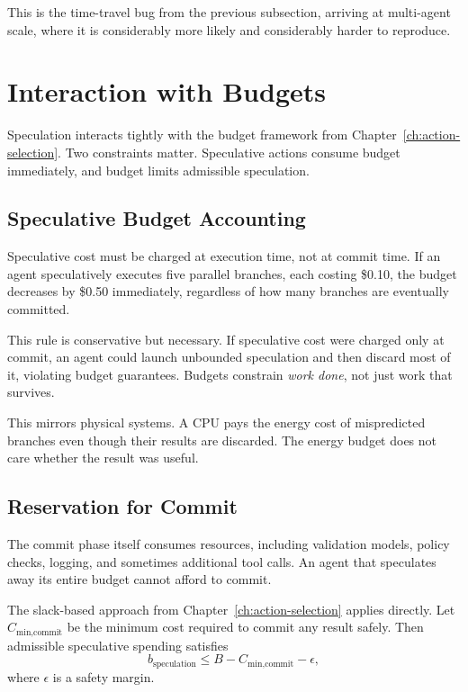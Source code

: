 This is the time-travel bug from the previous subsection, arriving at multi-agent
scale, where it is considerably more likely and considerably harder to reproduce.

\section{Interaction with Budgets}

Speculation interacts tightly with the budget framework from Chapter~\ref{ch:action-selection}. Two constraints matter. Speculative actions consume budget immediately, and budget limits admissible speculation.

\subsection{Speculative Budget Accounting}

Speculative cost must be charged at execution time, not at commit time. If an agent speculatively executes five parallel branches, each costing \$0.10, the budget decreases by \$0.50 immediately, regardless of how many branches are eventually committed.

This rule is conservative but necessary. If speculative cost were charged only at commit, an agent could launch unbounded speculation and then discard most of it, violating budget guarantees. Budgets constrain \emph{work done}, not just work that survives.

This mirrors physical systems. A CPU pays the energy cost of mispredicted branches even though their results are discarded. The energy budget does not care whether the result was useful.

\subsection{Reservation for Commit}

The commit phase itself consumes resources, including validation models, policy checks, logging, and sometimes additional tool calls. An agent that speculates away its entire budget cannot afford to commit.

The slack-based approach from Chapter~\ref{ch:action-selection} applies directly. Let $C_{\text{min,commit}}$ be the minimum cost required to commit any result safely. Then admissible speculative spending satisfies
\[
b_{\text{speculation}} \leq B - C_{\text{min,commit}} - \epsilon,
\]
where $\epsilon$ is a safety margin.

